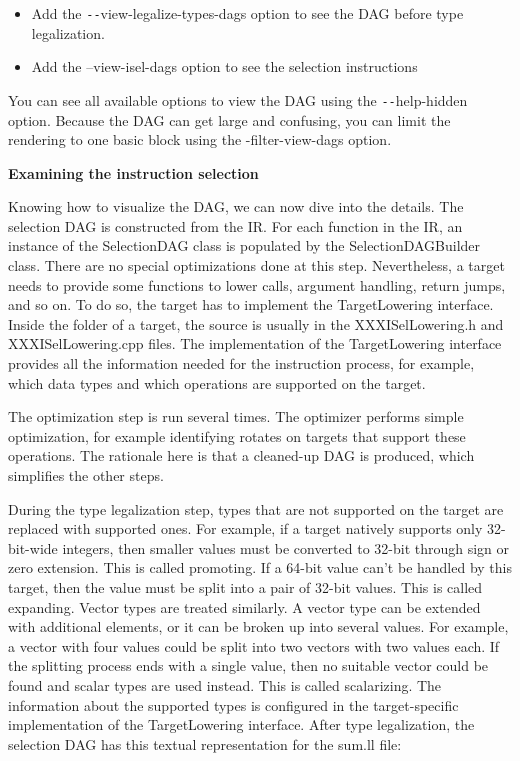 \begin{itemize}
\item Add the \verb|--|view-legalize-types-dags option to see the DAG before 
type legalization.
\item Add the –view-isel-dags option to see the selection instructions
\end{itemize}

You can see all available options to view the DAG using the \verb|--|help-hidden option. Because the DAG can get large and confusing, you can limit the rendering to one basic block using the -filter-view-dags option.\par

\hspace*{\fill} \par %
\textbf{Examining the instruction selection}

Knowing how to visualize the DAG, we can now dive into the details. The selection DAG is constructed from the IR. For each function in the IR, an instance of the SelectionDAG class is populated by the SelectionDAGBuilder class. There are no special optimizations done at this step. Nevertheless, a target needs to provide some functions to lower calls, argument handling, return jumps, and so on. To do so, the target has to implement the TargetLowering interface. Inside the folder of a target, the source is usually in the XXXISelLowering.h and XXXISelLowering.cpp files. The implementation of the TargetLowering interface provides all the information needed for the instruction process, for example, which data types and which operations are supported on the target.\par

The optimization step is run several times. The optimizer performs simple optimization, for example identifying rotates on targets that support these operations. The rationale here is that a cleaned-up DAG is produced, which simplifies the other steps.\par

During the type legalization step, types that are not supported on the target are replaced with supported ones. For example, if a target natively supports only 32-bit-wide integers, then smaller values must be converted to 32-bit through sign or zero extension. This is called promoting. If a 64-bit value can't be handled by this target, then the value must be split into a pair of 32-bit values. This is called expanding. Vector types are treated similarly. A vector type can be extended with additional elements, or it can be broken up into several values. For example, a vector with four values could be split into two vectors with two values each. If the splitting process ends with a single value, then no suitable vector could be found and scalar types are used instead. This is called scalarizing. The information about the supported types is configured in the target-specific implementation of the TargetLowering interface. After type legalization, the selection DAG has this textual representation for the sum.ll file:\par

